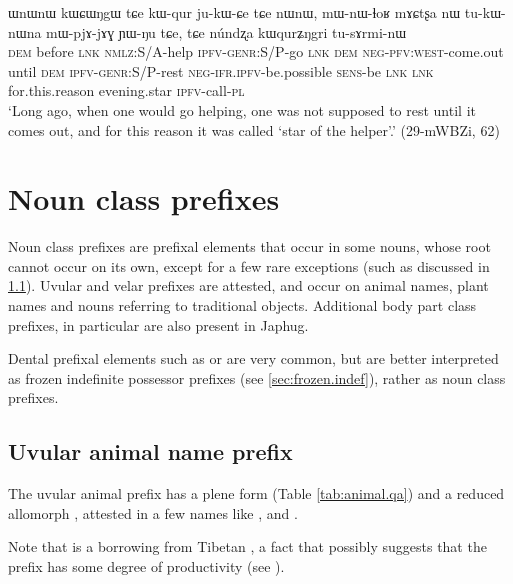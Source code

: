 \begin{exe}
\ex \label{ex:kWqur.ZNgri}
\gll ɯnɯnɯ kɯɕɯŋgɯ tɕe kɯ-qur ju-kɯ-ɕe tɕe nɯnɯ, mɯ-nɯ-ɬoʁ mɤɕtʂa nɯ tu-kɯ-nɯna mɯ-pjɤ-jɤɣ ɲɯ-ŋu tɕe,  tɕe núndʐa kɯqurʑŋgri tu-sɤrmi-nɯ \\
\textsc{dem} before \textsc{lnk} \textsc{nmlz}:S/A-help \textsc{ipfv}-\textsc{genr}:S/P-go \textsc{lnk} \textsc{dem} \textsc{neg}-\textsc{pfv}:\textsc{west}-come.out until \textsc{dem} \textsc{ipfv}-\textsc{genr}:S/P-rest \textsc{neg}-\textsc{ifr}.\textsc{ipfv}-be.possible \textsc{sens}-be \textsc{lnk} \textsc{lnk} for.this.reason evening.star \textsc{ipfv}-call-\textsc{pl} \\
\glt `Long ago, when one would go helping, one was not supposed to rest until it comes out, and for this reason it was called `star of the helper'.' (29-mWBZi, 62)
\end{exe}

 

\section{Noun class prefixes} \label{sec:class.prefixes}
Noun class prefixes are prefixal elements that occur in some nouns, whose root cannot occur on its own, except for a few rare exceptions (such as  discussed in \ref{sec:uvular.animal}). Uvular  and velar  prefixes are attested, and occur on animal names, plant names and nouns referring to traditional objects. Additional body part class prefixes, in particular  are also present in Japhug.

Dental prefixal elements such as  or  are very common, but  are  better interpreted as frozen indefinite possessor prefixes (see \ref{sec:frozen.indef}), rather as noun class prefixes.

\subsection{Uvular animal name prefix} \label{sec:uvular.animal}
The uvular animal prefix has a plene form  (Table \ref{tab:animal.qa}) and a reduced allomorph , attested in a few names like ,  and .

Note that  is a borrowing from Tibetan , a fact that possibly suggests that the  prefix has some degree of productivity (see \citealt{jacques14snom}). 

